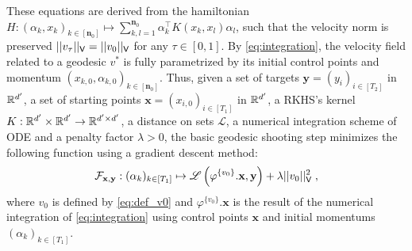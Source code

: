   These equations are derived from the hamiltonian $H:(\alpha_k,x_k)_{k\in [\mathbf{n}_0]}\mapsto \sum_{k,l=1}^{\mathbf{n}_0} \alpha_{k}^\top K(x_k,x_l)\alpha_{l}  $, such that
  the velocity norm is preserved $||v_\tau||_{\mathsf{V}}=||v_0||_{\mathsf{V}} $ for any $\tau\in [0,1]$.
   By \eqref{eq:integration}, the velocity field related to a geodesic $v^*$ is fully parametrized by its initial control points and momentum $(x_{k,0},\alpha_{k,0})_{k\in[\mathbf{n}_0]}$.
   Thus, given a set of targets $\mathbf{y}=(y_i)_{i\in[T_2]}$ in $\mathbb{R}^{d'}$, a set of starting points $\mathbf{x}=(x_{i,0})_{i\in[T_1]}$ in $\mathbb{R}^{d'}$, a RKHS's kernel $K:\mathbb{R}^{d'}\times \mathbb{R}^{d'}\to \mathbb{R}^{d'\times d'}$, a distance on sets $\mathscr{L}$, 
 a numerical integration scheme of ODE and a penalty factor $\lambda>0$, the basic geodesic shooting step minimizes the following function using a gradient descent method:
   \begin{equation}
    \label{eq:relaxation}
    \mathcal{F}_{\mathbf{x},\mathbf{y}}: (\alpha_k)_{k\in [T_1]}\mapsto \mathscr{L}\left(\varphi^{\{v_0\}}.\mathbf{x},\mathbf{y}\right)+\lambda||v_0||_{\mathsf{V}}^2 \;,  
   \end{equation}
   where $v_0$ is defined by \eqref{eq:def_v0} and $\varphi^{\{v_0\}}.\mathbf{x}$ is the result of the numerical integration of \eqref{eq:integration} using control points $\mathbf{x}$ and initial momentums $(\alpha_k)_{k\in[T_1]} $. 





  
   
  
  



